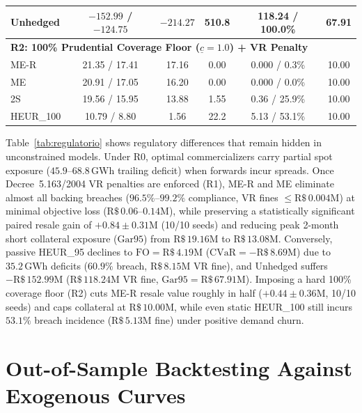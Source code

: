 \documentclass[10pt,journal]{IEEEtran}
\begin{document}
\begin{table}[t]
\begin{tabular}{lccccc}
Unhedged      & $-152.99$ / $-124.75$ & $-214.27$ & 510.8 & 118.24 / 100.0\% & 67.91 \\
\midrule
\multicolumn{6}{l}{\textbf{R2: 100\% Prudential Coverage Floor ($\underline{c}=1.0$) + VR Penalty}} \\
ME-R          & 21.35 / 17.41 & 17.16 & 0.00 & 0.000 / 0.3\%  & 10.00 \\
ME            & 20.91 / 17.05 & 16.20 & 0.00 & 0.000 / 0.0\%  & 10.00 \\
2S            & 19.56 / 15.95 & 13.88 & 1.55 & 0.36 / 25.9\%  & 10.00 \\
HEUR\_100     & 10.79 / 8.80  & 1.56  & 22.2 & 5.13 / 53.1\%  & 10.00 \\
\bottomrule
\end{tabular}
\end{table}

Table~\ref{tab:regulatorio} shows regulatory differences that remain hidden in unconstrained models. Under R0, optimal commercializers carry partial spot exposure ($45.9$--$68.8\,\text{GWh}$ trailing deficit) when forwards incur spreads. Once Decree~5.163/2004 VR penalties are enforced (R1), ME-R and ME eliminate almost all backing breaches ($96.5\%$--$99.2\%$ compliance, VR fines $\le \text{R\$}\,0.004\text{M}$) at minimal objective loss ($\text{R\$}\,0.06$--$0.14\text{M}$), while preserving a statistically significant paired resale gain of $+0.84 \pm 0.31\text{M}$ (10/10 seeds) and reducing peak 2-month short collateral exposure ($\text{Gar95}$) from $\text{R\$}\,19.16\text{M}$ to $\text{R\$}\,13.08\text{M}$. Conversely, passive HEUR\_95 declines to $\text{FO} = \text{R\$}\,4.19\text{M}$ ($\mathrm{CVaR} = -\text{R\$}\,8.69\text{M}$) due to $35.2\,\text{GWh}$ deficits ($60.9\%$ breach, $\text{R\$}\,8.15\text{M}$ VR fine), and Unhedged suffers $-\text{R\$}\,152.99\text{M}$ ($\text{R\$}\,118.24\text{M}$ VR fine, $\text{Gar95} = \text{R\$}\,67.91\text{M}$). Imposing a hard 100\% coverage floor (R2) cuts ME-R resale value roughly in half ($+0.44 \pm 0.36\text{M}$, 10/10 seeds) and caps collateral at $\text{R\$}\,10.00\text{M}$, while even static HEUR\_100 still incurs $53.1\%$ breach incidence ($\text{R\$}\,5.13\text{M}$ fine) under positive demand churn.

\section{Out-of-Sample Backtesting Against Exogenous Curves}
\label{sec:backtest}
\end{document}
